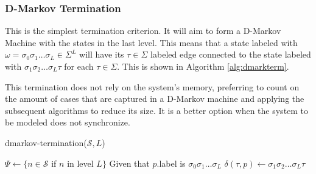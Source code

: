 {\subsubsection{D-Markov Termination}

This is the simplest termination criterion. It will aim to form a D-Markov Machine with the states in the last level. This means that a state labeled with $\omega = \sigma_0\sigma_1\ldots\sigma_L \in \Sigma^L$ will have its $\tau \in \Sigma$ labeled edge connected to the state labeled with $\sigma_1\sigma_2\ldots\sigma_L\tau$ for each $\tau \in \Sigma$. This is shown in Algorithm \ref{alg:dmarkterm}.

This termination does not rely on the system's memory, preferring to count on the amount of cases that are captured in a D-Markov machine and applying the subsequent algorithms to reduce its size. It is a better option when the system to be modeled does not synchronize. 

  \begin{algorithm}
  \caption{dmarkov-termination($\mathcal{S}, L$)\label{alg:dmarkterm}}
    \begin{algorithmic}[1]
      	\State $\Psi \gets \{n \in \mathcal{S}$ if $n$ in level $L\}$
      		\State Given that $p$.label is $\sigma_0\sigma_1\ldots\sigma_L$
      		\For{$\tau \in \Sigma$}
      			\State $\delta(\tau, p) \gets \sigma_1\sigma_2\ldots\sigma_L\tau$
      		\EndFor
      	\EndFor
      \EndProcedure
    \end{algorithmic}
  \end{algorithm}
  
}
